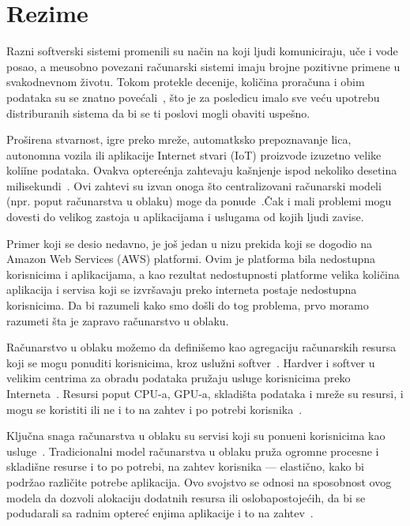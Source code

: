 \chapter*{Rezime}
\pagestyle{plain}

Razni softverski sistemi promenili su na\v cin na koji ljudi komuniciraju, u\v ce i vode posao, a me\dj usobno povezani ra\v cunarski sistemi imaju brojne pozitivne primene u svakodnevnom \v zivotu. Tokom protekle decenije, koli\v cina prora\v cuna i obim podataka su se znatno pove\'cali~\cite {ChiangZ16}, \v sto je za posledicu imalo sve ve\'cu upotrebu distriburanih sistema da bi se ti poslovi mogli obaviti uspe\v sno.

Pro\v sirena stvarnost, igre preko mre\v ze, automatksko prepoznavanje lica, autonomna vozila ili aplikacije Internet stvari (IoT) proizvode izuzetno velike koli\v ine podataka. Ovakva optere\'enja zahtevaju ka\v snjenje ispod nekoliko desetina milisekundi~\cite {ChiangZ16}. Ovi zahtevi su izvan onoga \v sto centralizovani ra\v cunarski modeli (npr. poput ra\v cunarstva u oblaku) moge da ponude~\cite {ChiangZ16}.\v Cak i mali problemi mogu dovesti do velikog zastoja u aplikacijama i uslugama od kojih ljudi zavise. 

Primer koji se desio nedavno, je još jedan u nizu prekida koji se dogodio na Amazon Web Services (AWS) platformi. Ovim je platforma bila nedostupna korisnicima i aplikacijama, a kao rezultat nedostupnosti platforme velika koli\v cina aplikacija i servisa koji se izvr\v savaju preko interneta postaje nedostupna korisnicima. Da bi razumeli kako smo do\v sli do tog problema, prvo moramo razumeti \v sta je zapravo ra\v cunarstvo u oblaku.

Računarstvo u oblaku mo\v zemo da defini\v semo kao agregaciju ra\v cunarskih resursa koji se mogu ponuditi korisnicima, kroz uslu\v zni softver~\cite {Vogels}. Hardver i softver u velikim centrima za obradu podataka pru\v zaju usluge korisnicima preko Interneta~\cite {AboveTheCloud}. Resursi poput CPU-a, GPU-a, skladi\v sta podataka i mre\v ze su resursi, i mogu se koristiti ili ne i to na zahtev i po potrebi korisnika~\cite {ZhangCB10}. 

Klju\v cna snaga ra\v cunarstva u oblaku su servisi koji su ponu\dj eni korisnicima kao usluge~\cite {Vogels}. Tradicionalni model ra\v cunarstva u oblaku pru\v za ogromne procesne i skladi\v sne resurse i to po potrebi, na zahtev korisnika --- elasti\v cno, kako bi podr\v zao razli\v cite potrebe aplikacija.  Ovo svojstvo se odnosi na sposobnost ovog modela da dozvoli alokaciju dodatnih resursa ili osloba\dj postoje\'cih, da bi se podudarali sa radnim optere\'c enjima aplikacije i to na zahtev~\cite {AssuncaoVB18}.

